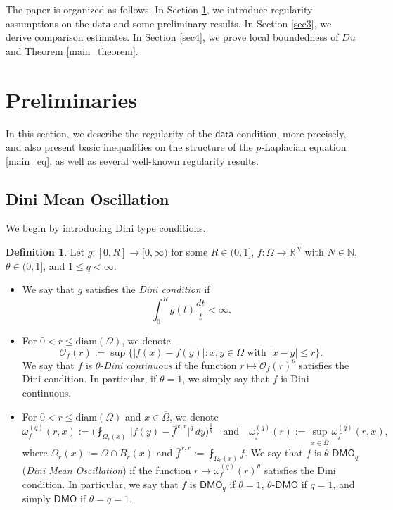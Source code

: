 \documentclass[reqno]{amsart}
\numberwithin{equation}{section}
\theoremstyle{plain}
\theoremstyle{definition}
\newtheorem{definition}[theorem]{Definition}
\theoremstyle{remark}
\providecommand{\abs}[1]{\lvert#1\rvert}
\begin{document}
The paper is organized as follows. In Section \ref{sec2}, we introduce regularity assumptions on the $\mathsf{data}$ and some preliminary results.  In Section \ref{sec3}, we derive comparison estimates. In Section \ref{sec4}, we prove local boundedness of $Du$ and Theorem \ref{main_theorem}.

\section{Preliminaries}  \label{sec2}

In this section, we describe the regularity of the $\mathsf{data}$-condition, more precisely, and also present basic inequalities on the structure of the $p$-Laplacian equation \eqref{main_eq}, as well as several well-known regularity results.

 

\subsection{Dini Mean Oscillation}\label{subsec:Dini}
We begin by introducing Dini type conditions.
\begin{definition} \label{def:Dini}
Let $g: [0,R]\to [0,\infty)$ for some $R\in(0,1]$, $f: \Omega\to \mathbb{R}^N$ with $N\in \mathbb{N}$, $\theta\in(0,1]$, and $1\le q<\infty$.
\begin{itemize}
\item  We say that $g$ satisfies the \textit{Dini condition} if 
\[
\int_0^R g(t)\frac{dt}{t} <\infty.
\]  
\item  For $0<r \le \mathrm{diam}(\Omega)$, we denote
\[
\mathcal{O}_f(r):= \sup\{|f(x)-f(y)| : x,y\in\Omega \text{ with } |x-y|\le r\}.
\]
 We say that $f$ is $\theta$-\textit{Dini continuous} if the function $r \mapsto \mathcal{O}_f(r)^{\theta}$ satisfies the Dini condition.
 In particular, if $\theta=1$, we simply say that $f$ is Dini continuous.
 
 \item For $0<r \le \mathrm{diam}(\Omega)$ and $x\in \overline{\Omega}$, we denote
 \begin{equation}\label{eq:Lpmeanoscillation}
\omega^{(q)}_f(r, x):= \bigg(\fint_{\Omega_r(x)} \,\abs{f(y)-\bar{f}^{x,r}}^q\,dy\bigg)^{\frac{1}{q}}
\quad\text{and}\quad
\omega^{(q)}_f(r):= \sup_{x \in \overline{\Omega}} \omega^{(q)}_f(r, x),
\end{equation}
where $\Omega_r(x):= \Omega\cap B_r(x)$ and $\bar{f}^{x,r}:=\fint_{\Omega_r(x)} f$. 
 We say that $f$ is $\theta$-$\mathsf{DMO}_{q}$ (\textit{Dini Mean Oscillation}) if the function $r \mapsto \omega^{(q)}_f(r)^{\theta}$ satisfies the Dini condition.
 In particular, we say that $f$ is $\mathsf{DMO}_{q}$ if $\theta=1$, $\theta$-$\mathsf{DMO}$ if $q=1$, and simply $\mathsf{DMO}$ if $\theta=q=1$.
 \end{itemize}
\end{definition}
\end{document}
